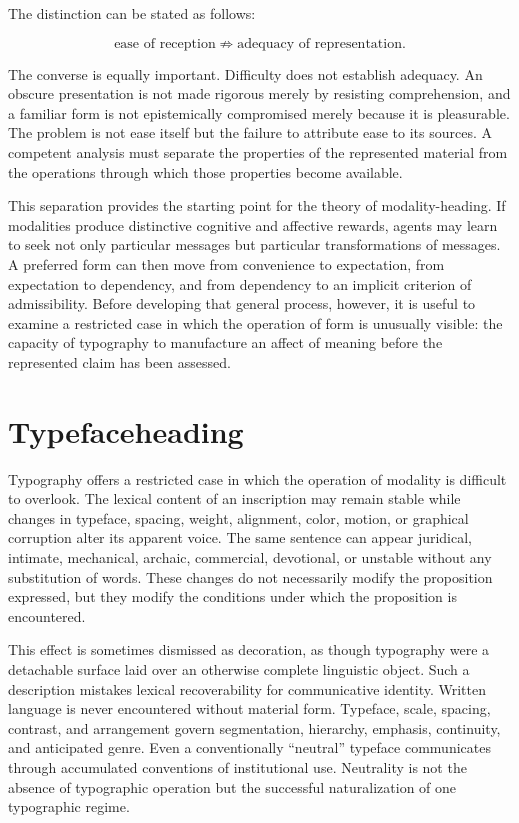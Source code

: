 \documentclass[11pt]{article}
\begin{document}
The distinction can be stated as follows:

\begin{equation}
  \text{ease of reception}
  \not\Rightarrow
  \text{adequacy of representation}.
  \label{eq:ease-adequacy}
\end{equation}

The converse is equally important. Difficulty does not establish adequacy.
An obscure presentation is not made rigorous merely by resisting
comprehension, and a familiar form is not epistemically compromised merely
because it is pleasurable. The problem is not ease itself but the failure to
attribute ease to its sources. A competent analysis must separate the
properties of the represented material from the operations through which
those properties become available.

This separation provides the starting point for the theory of
modality-heading. If modalities produce distinctive cognitive and affective
rewards, agents may learn to seek not only particular messages but particular
transformations of messages. A preferred form can then move from convenience
to expectation, from expectation to dependency, and from dependency to an
implicit criterion of admissibility. Before developing that general process,
however, it is useful to examine a restricted case in which the operation of
form is unusually visible: the capacity of typography to manufacture an
affect of meaning before the represented claim has been assessed.

\section{Typefaceheading}

Typography offers a restricted case in which the operation of modality is
difficult to overlook. The lexical content of an inscription may remain
stable while changes in typeface, spacing, weight, alignment, color, motion,
or graphical corruption alter its apparent voice. The same sentence can
appear juridical, intimate, mechanical, archaic, commercial, devotional, or
unstable without any substitution of words. These changes do not necessarily
modify the proposition expressed, but they modify the conditions under which
the proposition is encountered.

This effect is sometimes dismissed as decoration, as though typography were
a detachable surface laid over an otherwise complete linguistic object.
Such a description mistakes lexical recoverability for communicative
identity. Written language is never encountered without material form.
Typeface, scale, spacing, contrast, and arrangement govern segmentation,
hierarchy, emphasis, continuity, and anticipated genre. Even a conventionally
``neutral'' typeface communicates through accumulated conventions of
institutional use. Neutrality is not the absence of typographic operation but
the successful naturalization of one typographic regime.
\end{document}
